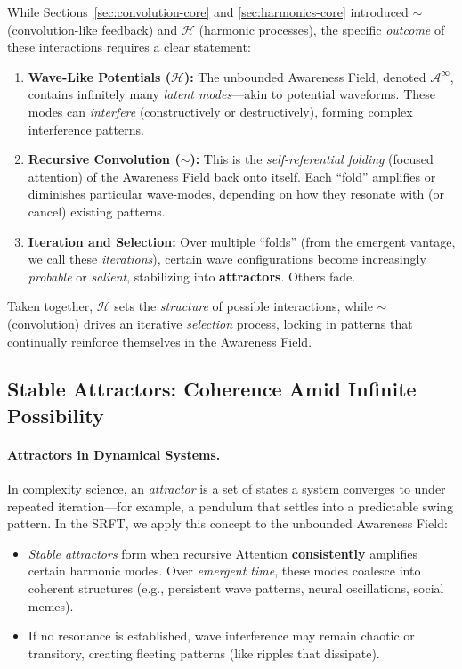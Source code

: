 \documentclass[12pt,a4paper]{article}
\begin{document}
While Sections~\ref{sec:convolution-core} and \ref{sec:harmonics-core} introduced
\(\sim\) (convolution-like feedback) and \(\mathcal{H}\) (harmonic processes),
the specific \emph{outcome} of these interactions requires a clear statement:
\begin{enumerate}
    \item \textbf{Wave-Like Potentials (\(\mathcal{H}\)):} The unbounded Awareness Field,
    denoted \(\mathscr{A}^\infty\), contains infinitely many \emph{latent modes}---akin
    to potential waveforms. These modes can \emph{interfere} (constructively or
    destructively), forming complex interference patterns.

    \item \textbf{Recursive Convolution (\(\sim\)):} This is the \emph{self-referential
    folding} (focused attention) of the Awareness Field back onto itself. Each ``fold'' amplifies or
    diminishes particular wave-modes, depending on how they resonate with (or cancel)
    existing patterns.

    \item \textbf{Iteration and Selection:} Over multiple ``folds'' (from the emergent
    vantage, we call these \emph{iterations}), certain wave configurations become
    increasingly \emph{probable} or \emph{salient}, stabilizing into \textbf{attractors}.
    Others fade.
\end{enumerate}
Taken together, \(\mathcal{H}\) sets the \emph{structure} of possible interactions,
while \(\sim\) (convolution) drives an iterative \emph{selection} process, locking
in patterns that continually reinforce themselves in the Awareness Field.

\subsection{Stable Attractors: Coherence Amid Infinite Possibility}
\label{subsec:stable-attractors}

\paragraph{Attractors in Dynamical Systems.}
In complexity science, an \emph{attractor} is a set of states a system converges
to under repeated iteration---for example, a pendulum that settles into a
predictable swing pattern. In the SRFT, we apply this concept to the unbounded
Awareness Field:
\begin{itemize}
    \item \emph{Stable attractors} form when recursive Attention \textbf{consistently}
    amplifies certain harmonic modes. Over \emph{emergent time}, these modes coalesce
    into coherent structures (e.g., persistent wave patterns, neural oscillations,
    social memes).
    \item If no resonance is established, wave interference may remain chaotic or
    transitory, creating fleeting patterns (like ripples that dissipate).
\end{itemize}
\end{document}
